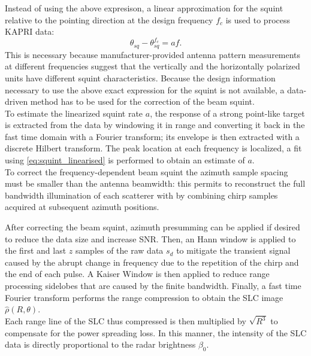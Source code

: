 Instead of using the above expresison, a linear approximation for the squint relative to the pointing direction at the design frequency $f_c$ is used to process KAPRI data:
\begin{equation}\label{eq:squint_linearised}
	\theta_{sq} - \theta_{sq}^{f_{c}}  =  a f.
\end{equation}
This is necessary because manufacturer-provided antenna pattern measurements at different frequencies suggest that the vertically and the horizontally polarized units have different squint characteristics. Because the design information necessary to use the above exact expression for the squint is not available, a data-driven method has to be used for the correction of the beam squint.\\ To estimate the linearized squint rate $a$, the response of a strong point-like target is extracted from the data by windowing it in range and converting it back in the fast time domain with a Fourier transform; its envelope is then extracted with a discrete Hilbert transform. The peak location at each frequency is localized, a fit using \autoref{eq:squint_linearised} is performed to obtain an estimate of $a$.\\
To correct the frequency-dependent beam squint the azimuth sample spacing must be smaller than the antenna beamwidth: this permits to reconstruct the full bandwidth illumination of each scatterer with by combining chirp samples acquired at subsequent azimuth positions.

After correcting the beam squint, azimuth presumming can be applied if desired to reduce the data size and increase SNR. Then, an Hann window is applied to the first and last $z$ samples of the raw data $s_{d}$ to mitigate the transient signal caused by the abrupt change in frequency due to the repetition of the chirp and the end of each pulse. A Kaiser Window is then applied to reduce range processing sidelobes that are caused by the finite bandwidth. Finally, a fast time Fourier transform performs the range compression to obtain the SLC image $\hat{\rho}\left(R, \theta\right)$.
\\ Each range line of the SLC thus compressed is then multiplied by $\sqrt{R^3}$ to compensate for the power spreading loss. In this manner, the intensity of the SLC data is directly proportional to the radar brightness $\beta_{0}$\cite{Raney1994}. 
